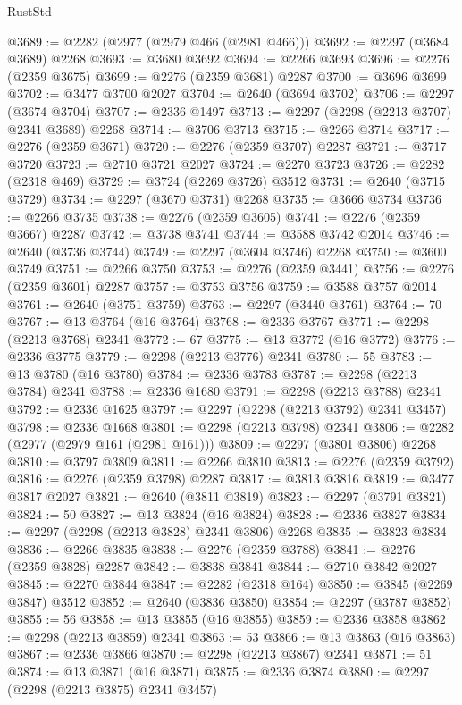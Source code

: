 \begin{lexlean}{RustStd}
\begin{coremodule}
@3689 := @2282 (@2977 (@2979 @466 (@2981 @466)))
@3692 := @2297 (@3684 @3689) @2268
@3693 := @3680 @3692
@3694 := @2266 @3693
@3696 := @2276 (@2359 @3675)
@3699 := @2276 (@2359 @3681) @2287
@3700 := @3696 @3699
@3702 := @3477 @3700 @2027
@3704 := @2640 (@3694 @3702)
@3706 := @2297 (@3674 @3704)
@3707 := @2336 @1497
@3713 := @2297 (@2298 (@2213 @3707) @2341 @3689) @2268
@3714 := @3706 @3713
@3715 := @2266 @3714
@3717 := @2276 (@2359 @3671)
@3720 := @2276 (@2359 @3707) @2287
@3721 := @3717 @3720
@3723 := @2710 @3721 @2027
@3724 := @2270 @3723
@3726 := @2282 (@2318 @469)
@3729 := @3724 (@2269 @3726) @3512
@3731 := @2640 (@3715 @3729)
@3734 := @2297 (@3670 @3731) @2268
@3735 := @3666 @3734
@3736 := @2266 @3735
@3738 := @2276 (@2359 @3605)
@3741 := @2276 (@2359 @3667) @2287
@3742 := @3738 @3741
@3744 := @3588 @3742 @2014
@3746 := @2640 (@3736 @3744)
@3749 := @2297 (@3604 @3746) @2268
@3750 := @3600 @3749
@3751 := @2266 @3750
@3753 := @2276 (@2359 @3441)
@3756 := @2276 (@2359 @3601) @2287
@3757 := @3753 @3756
@3759 := @3588 @3757 @2014
@3761 := @2640 (@3751 @3759)
@3763 := @2297 (@3440 @3761)
@3764 := 70
@3767 := @13 @3764 (@16 @3764)
@3768 := @2336 @3767
@3771 := @2298 (@2213 @3768) @2341
@3772 := 67
@3775 := @13 @3772 (@16 @3772)
@3776 := @2336 @3775
@3779 := @2298 (@2213 @3776) @2341
@3780 := 55
@3783 := @13 @3780 (@16 @3780)
@3784 := @2336 @3783
@3787 := @2298 (@2213 @3784) @2341
@3788 := @2336 @1680
@3791 := @2298 (@2213 @3788) @2341
@3792 := @2336 @1625
@3797 := @2297 (@2298 (@2213 @3792) @2341 @3457)
@3798 := @2336 @1668
@3801 := @2298 (@2213 @3798) @2341
@3806 := @2282 (@2977 (@2979 @161 (@2981 @161)))
@3809 := @2297 (@3801 @3806) @2268
@3810 := @3797 @3809
@3811 := @2266 @3810
@3813 := @2276 (@2359 @3792)
@3816 := @2276 (@2359 @3798) @2287
@3817 := @3813 @3816
@3819 := @3477 @3817 @2027
@3821 := @2640 (@3811 @3819)
@3823 := @2297 (@3791 @3821)
@3824 := 50
@3827 := @13 @3824 (@16 @3824)
@3828 := @2336 @3827
@3834 := @2297 (@2298 (@2213 @3828) @2341 @3806) @2268
@3835 := @3823 @3834
@3836 := @2266 @3835
@3838 := @2276 (@2359 @3788)
@3841 := @2276 (@2359 @3828) @2287
@3842 := @3838 @3841
@3844 := @2710 @3842 @2027
@3845 := @2270 @3844
@3847 := @2282 (@2318 @164)
@3850 := @3845 (@2269 @3847) @3512
@3852 := @2640 (@3836 @3850)
@3854 := @2297 (@3787 @3852)
@3855 := 56
@3858 := @13 @3855 (@16 @3855)
@3859 := @2336 @3858
@3862 := @2298 (@2213 @3859) @2341
@3863 := 53
@3866 := @13 @3863 (@16 @3863)
@3867 := @2336 @3866
@3870 := @2298 (@2213 @3867) @2341
@3871 := 51
@3874 := @13 @3871 (@16 @3871)
@3875 := @2336 @3874
@3880 := @2297 (@2298 (@2213 @3875) @2341 @3457)

\end{coremodule}
\end{lexlean}
